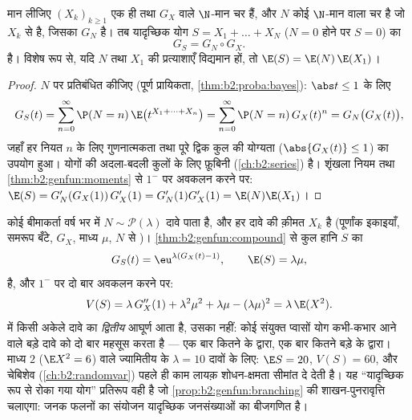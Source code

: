 \begin{theorem}\label{thm:b2:genfun:compound}
मान लीजिए $(X_k)_{k\geq1}$ एक ही  तथा  $G_X$ वाले  $\N$-मान
चर हैं, और $N$ कोई $\N$-मान वाला चर है जो $X_k$ से  है, जिसका
 $G_N$ है। तब यादृच्छिक योग $S = X_1 + \dots + X_N$ ($N = 0$ होने पर $S = 0$) का 
\[
G_S = G_N \circ G_X .
\]
है। विशेष रूप से, यदि $N$ तथा $X_1$ की प्रत्याशाएँ विद्यमान हों, तो
$\E(S) =
\E(N)\,\E(X_1)$।
\end{theorem}

\begin{proof}
$N$ पर प्रतिबंधित कीजिए (पूर्ण प्रायिकता, \cref{thm:b2:proba:bayes}): $\abs t \leq 1$ के लिए
\[
G_S(t) = \sum_{n=0}^\infty \P(N = n)\,
\E\bigl(t^{X_1 + \dots + X_n}\bigr)
= \sum_{n=0}^\infty \P(N = n)\,G_X(t)^n
= G_N\bigl(G_X(t)\bigr),
\]
जहाँ हर नियत $n$ के लिए गुणनात्मकता तथा पूरे द्विक कुल की योग्यता
($\abs{G_X(t)} \leq 1$) का उपयोग हुआ। योगों की अदला-बदली  कुलों के लिए फ़ूबिनी
(\cref{ch:b2:series}) है। शृंखला नियम तथा \cref{thm:b2:genfun:moments} से $1^-$ पर अवकलन करने पर: $\E(S) = G_N'(G_X(1))\,G_X'(1)
= G_N'(1)G_X'(1) = \E(N)\E(X_1)$।
\end{proof}

\begin{example}[संयुक्त प्वासों: वार्षिक बीमा-हानियाँ]\label{ex:b2:genfun:compoundpoisson}
कोई बीमाकर्ता वर्ष भर में $N \sim \mathcal P(\lambda)$ दावे पाता है, और हर दावे की क़ीमत
$X_k$ है (पूर्णांक इकाइयाँ,  समरूप बँटे,  $G_X$, माध्य
$\mu$, $N$ से )। \cref{thm:b2:genfun:compound} से कुल हानि $S$ का
\[
G_S(t) = \eu^{\lambda(G_X(t) - 1)},
\qquad
\E(S) = \lambda\mu ,
\]
है, और $1^-$ पर दो बार अवकलन करने पर:
\[
V(S) = \lambda\,G_X''(1) + \lambda^2\mu^2 + \lambda\mu -
(\lambda\mu)^2 = \lambda\,\E(X^2) .
\]
 में किसी अकेले दावे का \emph{द्वितीय} आघूर्ण आता है, उसका
 नहीं: कोई संयुक्त प्वासों योग कभी-कभार आने वाले बड़े दावे को
दो बार महसूस करता है --- एक बार कितने के द्वारा, एक बार कितने बड़े
के द्वारा। माध्य $2$ ($\E X^2 = 6$) वाले ज्यामितीय  के $\lambda = 10$ दावों के
लिए: $\E S = 20$, $V(S) = 60$, और चेबिशेव (\cref{ch:b2:randomvar}) पहले ही काम लायक़
शोधन-क्षमता सीमांत दे देती है। यह ``यादृच्छिक रूप से रोका गया
योग'' प्रतिरूप वही है जो \cref{prop:b2:genfun:branching} की शाखन-पुनरावृत्ति चलाएगा: जनक
फलनों का संयोजन यादृच्छिक जनसंख्याओं का बीजगणित है।
\end{example}

